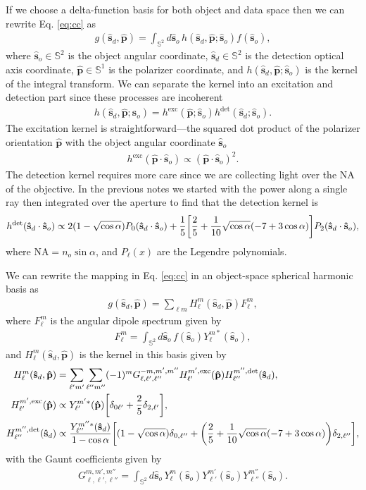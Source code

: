 \documentclass[11pt]{article}
\providecommand{\so}{\mathbf{\hat{s}}_o}
\providecommand{\sd}{\mathbf{\hat{s}}_d}
\providecommand{\pp}{\mathbf{\hat{p}}}
\providecommand{\mbb}[1]{\mathbb{#1}}
\providecommand{\ints}[1]{\int_{\mbb{S}^{#1}}}
\let\originalleft\left
\let\originalright\right
\renewcommand{\left}{\mathopen{}\mathclose\bgroup\originalleft}
\renewcommand{\right}{\aftergroup\egroup\originalright}
\begin{document}
If we choose a delta-function basis for both object and data space then we can
rewrite Eq. \eqref{eq:cc} as 
\begin{align}
  g(\sd, \pp) = \ints{2}d\so\, h(\sd,\pp;\so)f(\so),\label{eq:fwd}
\end{align}
where $\so \in \mbb{S}^2$ is the object angular coordinate, $\sd \in \mbb{S}^2$
is the detection optical axis coordinate, $\pp \in \mbb{S}^1$ is the polarizer
coordinate, and $h(\sd,\pp;\so)$ is the kernel of the integral transform. We can
separate the kernel into an excitation and detection part since these processes
are incoherent
\begin{align}
  h(\sd, \pp;\so) = h^{\text{exc}}(\pp;\so)h^{\text{det}}(\sd;\so). \label{eq:kern}
\end{align}
The excitation kernel is straightforward---the squared dot product of the
polarizer orientation $\pp$ with the object angular coordinate $\so$
\begin{align}
  h^{\text{exc}}(\pp\cdot\so) \propto (\pp\cdot\so)^2. \label{eq:exckern}
\end{align}
The detection kernel requires more care since we are collecting light over the
NA of the objective. In the previous notes we started with the power along a
single ray then integrated over the aperture to find that the detection kernel is
\begin{align}
  h^{\text{det}}(\sd\cdot\so) \propto 2(1 - \sqrt{\cos\alpha})P_0(\sd\cdot\so) + \frac{1}{5}\left[\frac{2}{5} + \frac{1}{10}\sqrt{\cos\alpha}(-7+3\cos\alpha)\right]P_2(\sd\cdot\so),
\end{align}
where $\text{NA} = n_o\sin\alpha$, and $P_{\ell}(x)$ are the Legendre
polynomials.

We can rewrite the mapping in Eq. \eqref{eq:cc} in an object-space spherical
harmonic basis as
\begin{align}
  g(\sd, \pp) = \sum_{\ell m}H_\ell^m(\sd, \pp)F_\ell^m,\label{eq:fwdsh}
\end{align}
where $F_\ell^m$ is the angular dipole spectrum given by 
\begin{align}
  F_\ell^m = \int_{\mbb{S}^2}d\so\, f(\so)Y_\ell^{m*}(\so),
\end{align}
and $H_\ell^m(\sd, \pp)$ is the kernel in this basis given by
\begin{align}
  H_\ell^m(\sd, \pp) &= \sum_{\ell' m'}\sum_{\ell'' m''}(-1)^m G_{\ell,\ell',\ell''}^{-m,m',m''}H_{\ell'}^{m',\text{exc}}(\pp)H_{\ell''}^{m'',\text{det}}(\sd),\label{eq:triple4}\\
    H_{\ell'}^{m',\text{exc}}(\pp) &\propto Y_{\ell'}^{m'*}(\pp)\left[\delta_{0\ell'} + \frac{2}{5}\delta_{2,\ell'}\right],\label{eq:dipexc}\\
    H_{\ell''}^{m'',\text{det}}(\sd) &\propto \frac{Y_{\ell''}^{m''*}(\sd)}{1 - \cos\alpha}\left[(1 - \sqrt{\cos\alpha})\delta_{0,\ell''} + \left(\frac{2}{5} + \frac{1}{10}\sqrt{\cos\alpha}(-7+3\cos\alpha)\right)\delta_{2,\ell''}\right],\label{eq:dipdet}
\end{align}
with the Gaunt coefficients given by 
\begin{align}
  G_{\ell,\ell',\ell''}^{m,m',m''} = \ints{2}d\so\, Y_\ell^{m}(\so)Y_{\ell'}^{m'}(\so)Y_{\ell''}^{m''}(\so).
\end{align}
\end{document}
